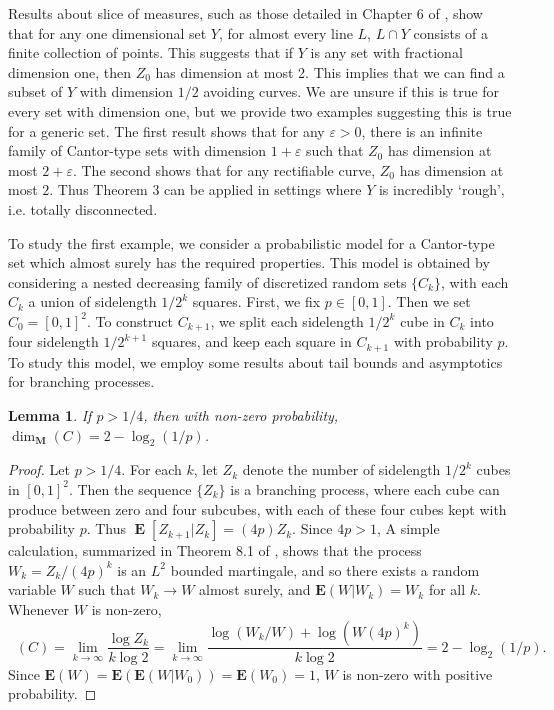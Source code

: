 \documentclass[dvipsnames,letterpaper,12pt]{article}
\numberwithin{equation}{section}
\theoremstyle{plain}
\newtheorem{lemma}{Lemma}
\theoremstyle{remark}
\DeclareMathOperator{\minkdim}{\dim_{\mathbf{M}}}
\DeclareMathOperator{\Expect}{\mathbf{E}}
\begin{document}
Results about slice of measures, such as those detailed in Chapter 6 of \cite{Matilla}, show that for any one dimensional set $Y$, for almost every line $L$, $L \cap Y$ consists of a finite collection of points. This suggests that if $Y$ is any set with fractional dimension one, then $Z_0$ has dimension at most 2. This implies that we can find a subset of $Y$ with dimension $1/2$ avoiding curves. We are unsure if this is true for every set with dimension one, but we provide two examples suggesting this is true for a generic set. The first result shows that for any $\varepsilon > 0$, there is an infinite family of Cantor-type sets with dimension $1 + \varepsilon$ such that $Z_0$ has dimension at most $2 + \varepsilon$. The second shows that for any rectifiable curve, $Z_0$ has dimension at most $2$. Thus Theorem 3 can be applied in settings where $Y$ is incredibly `rough', i.e. totally disconnected.

To study the first example, we consider a probabilistic model for a Cantor-type set which almost surely has the required properties. This model is obtained by considering a nested decreasing family of discretized random sets $\{ C_k \}$, with each $C_k$ a union of sidelength $1/2^k$ squares. First, we fix $p \in [0,1]$. Then we set $C_0 = [0,1]^2$. To construct $C_{k+1}$, we split each sidelength $1/2^k$ cube in $C_k$ into four sidelength $1/2^{k+1}$ squares, and keep each square in $C_{k+1}$ with probability $p$. To study this model, we employ some results about tail bounds and asymptotics for branching processes.

\begin{lemma} \label{randomdimension}
	If $p > 1/4$, then with non-zero probability, $\dim_{\mathbf{M}}(C) = 2 - \log_2(1/p)$.
\end{lemma}
\begin{proof}
	Let $p > 1/4$. For each $k$, let $Z_k$ denote the number of sidelength $1/2^k$ cubes in $[0,1]^2$. Then the sequence $\{ Z_k \}$ is a branching process, where each cube can produce between zero and four subcubes, with each of these four cubes kept with probability $p$. Thus $\Expect[Z_{k+1}|Z_k] = (4p) Z_k$. Since $4p > 1$, A simple calculation, summarized in Theorem 8.1 of \cite{Harris}, shows that the process $W_k = Z_k / (4p)^k$ is an $L^2$ bounded martingale, and so there exists a random variable $W$ such that $W_k \to W$ almost surely, and $\mathbf{E}(W|W_k) = W_k$ for all $k$. Whenever $W$ is non-zero,
	\[ \minkdim(C) = \lim_{k \to \infty} \frac{\log Z_k}{k \log 2} = \lim_{k \to \infty} \frac{\log(W_k/W) + \log(W (4p)^k)}{k \log 2} = 2 - \log_2(1/p). \]
	Since $\mathbf{E}(W) = \mathbf{E}(\mathbf{E}(W|W_0)) = \mathbf{E}(W_0) = 1$, $W$ is non-zero with positive probability.
\end{proof}
\end{document}
